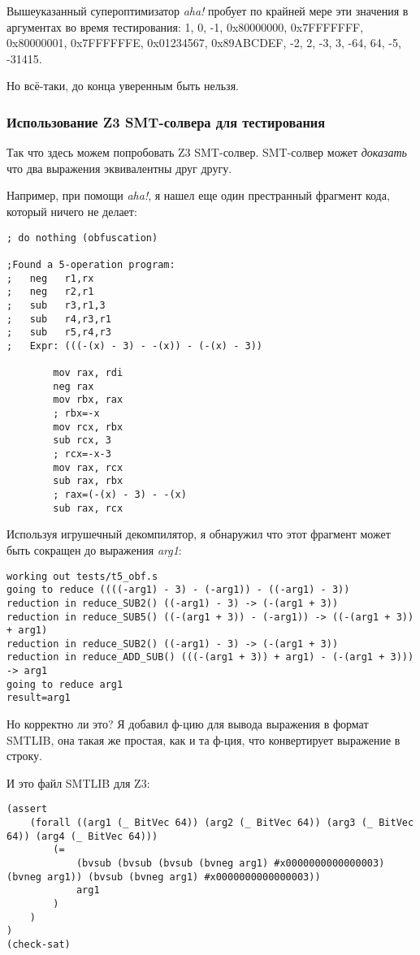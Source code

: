 Вышеуказанный супероптимизатор \textit{aha!} пробует по крайней мере эти значения в аргументах во время тестирования:
1, 0, -1, 0x80000000, 0x7FFFFFFF, 0x80000001, 0x7FFFFFFE, 0x01234567, 0x89ABCDEF, -2, 2, -3, 3,
-64, 64, -5, -31415.

Но всё-таки, до конца уверенным быть нельзя.

\subsubsection{Использование Z3 \ac{SMT}-солвера для тестирования}

Так что здесь можем попробовать Z3 \ac{SMT}-солвер.
SMT-солвер может \textit{доказать} что два выражения эквивалентны друг другу.

Например, при помощи \textit{aha!}, я нашел еще один престранный фрагмент кода, который ничего не делает:

\begin{lstlisting}
; do nothing (obfuscation)

;Found a 5-operation program:
;   neg   r1,rx
;   neg   r2,r1
;   sub   r3,r1,3
;   sub   r4,r3,r1
;   sub   r5,r4,r3
;   Expr: (((-(x) - 3) - -(x)) - (-(x) - 3))

        mov rax, rdi
        neg rax
        mov rbx, rax
        ; rbx=-x
        mov rcx, rbx
        sub rcx, 3
        ; rcx=-x-3
        mov rax, rcx
        sub rax, rbx
        ; rax=(-(x) - 3) - -(x)
        sub rax, rcx
\end{lstlisting}

Используя игрушечный декомпилятор, я обнаружил что этот фрагмент может быть сокращен до выражения \textit{arg1}:

\begin{lstlisting}
working out tests/t5_obf.s
going to reduce ((((-arg1) - 3) - (-arg1)) - ((-arg1) - 3))
reduction in reduce_SUB2() ((-arg1) - 3) -> (-(arg1 + 3))
reduction in reduce_SUB5() ((-(arg1 + 3)) - (-arg1)) -> ((-(arg1 + 3)) + arg1)
reduction in reduce_SUB2() ((-arg1) - 3) -> (-(arg1 + 3))
reduction in reduce_ADD_SUB() (((-(arg1 + 3)) + arg1) - (-(arg1 + 3))) -> arg1
going to reduce arg1
result=arg1
\end{lstlisting}

Но корректно ли это?
Я добавил ф-цию для вывода выражения в формат SMTLIB, она такая же простая, как и та ф-ция, что конвертирует
выражение в строку.

И это файл SMTLIB для Z3:

\begin{lstlisting}
(assert
    (forall ((arg1 (_ BitVec 64)) (arg2 (_ BitVec 64)) (arg3 (_ BitVec 64)) (arg4 (_ BitVec 64)))
        (=
            (bvsub (bvsub (bvsub (bvneg arg1) #x0000000000000003) (bvneg arg1)) (bvsub (bvneg arg1) #x0000000000000003))
            arg1
        )
    )
)
(check-sat)
\end{lstlisting}

